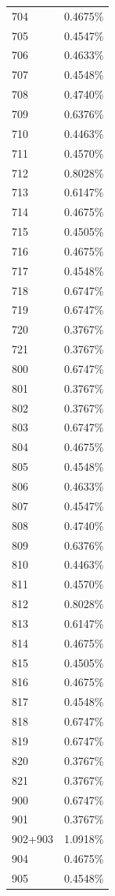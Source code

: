\documentclass[
  14pt,
]{book}
\begin{document}
\begin{longtable}[]{@{}ll@{}}
704 & 0.4675\% \\
705 & 0.4547\% \\
706 & 0.4633\% \\
707 & 0.4548\% \\
708 & 0.4740\% \\
709 & 0.6376\% \\
710 & 0.4463\% \\
711 & 0.4570\% \\
712 & 0.8028\% \\
713 & 0.6147\% \\
714 & 0.4675\% \\
715 & 0.4505\% \\
716 & 0.4675\% \\
717 & 0.4548\% \\
718 & 0.6747\% \\
719 & 0.6747\% \\
720 & 0.3767\% \\
721 & 0.3767\% \\
800 & 0.6747\% \\
801 & 0.3767\% \\
802 & 0.3767\% \\
803 & 0.6747\% \\
804 & 0.4675\% \\
805 & 0.4548\% \\
806 & 0.4633\% \\
807 & 0.4547\% \\
808 & 0.4740\% \\
809 & 0.6376\% \\
810 & 0.4463\% \\
811 & 0.4570\% \\
812 & 0.8028\% \\
813 & 0.6147\% \\
814 & 0.4675\% \\
815 & 0.4505\% \\
816 & 0.4675\% \\
817 & 0.4548\% \\
818 & 0.6747\% \\
819 & 0.6747\% \\
820 & 0.3767\% \\
821 & 0.3767\% \\
900 & 0.6747\% \\
901 & 0.3767\% \\
902+903 & 1.0918\% \\
904 & 0.4675\% \\
905 & 0.4548\% \\

\end{longtable}
\end{document}
